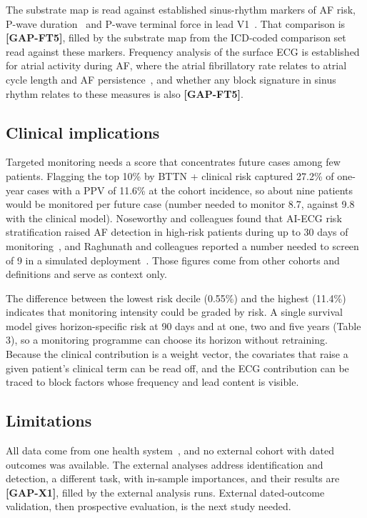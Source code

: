\documentclass[preprint,12pt]{elsarticle}
\begin{document}
The substrate map is read against established sinus-rhythm markers of AF risk, P-wave duration~\cite{nielsen2015} and P-wave terminal force in lead V1~\cite{huang2020,wolder2023}. That comparison is \textbf{[GAP-FT5]}, filled by the substrate map from the ICD-coded comparison set read against these markers. Frequency analysis of the surface ECG is established for atrial activity during AF, where the atrial fibrillatory rate relates to atrial cycle length and AF persistence~\cite{bollmann2006,platonov2014}, and whether any block signature in sinus rhythm relates to these measures is also \textbf{[GAP-FT5]}.

\subsection{Clinical implications}

Targeted monitoring needs a score that concentrates future cases among few patients. Flagging the top 10\% by BTTN + clinical risk captured 27.2\% of one-year cases with a PPV of 11.6\% at the cohort incidence, so about nine patients would be monitored per future case (number needed to monitor 8.7, against 9.8 with the clinical model). Noseworthy and colleagues found that AI-ECG risk stratification raised AF detection in high-risk patients during up to 30 days of monitoring~\cite{noseworthy2022}, and Raghunath and colleagues reported a number needed to screen of 9 in a simulated deployment~\cite{raghunath2021}. Those figures come from other cohorts and definitions and serve as context only.

The difference between the lowest risk decile (0.55\%) and the highest (11.4\%) indicates that monitoring intensity could be graded by risk. A single survival model gives horizon-specific risk at 90 days and at one, two and five years (Table 3), so a monitoring programme can choose its horizon without retraining. Because the clinical contribution is a weight vector, the covariates that raise a given patient's clinical term can be read off, and the ECG contribution can be traced to block factors whose frequency and lead content is visible.

\subsection{Limitations}

All data come from one health system~\cite{johnson2023}, and no external cohort with dated outcomes was available. The external analyses address identification and detection, a different task, with in-sample importances, and their results are \textbf{[GAP-X1]}, filled by the external analysis runs. External dated-outcome validation, then prospective evaluation, is the next study needed.
\end{document}
